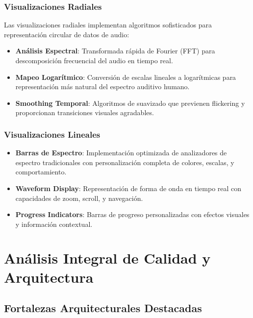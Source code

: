 \documentclass[a4paper]{article}
\begin{document}
\subsubsection{Visualizaciones Radiales}

Las visualizaciones radiales implementan algoritmos sofisticados para representación circular de datos de audio:

\begin{itemize}
\item \textbf{Análisis Espectral}: Transformada rápida de Fourier (FFT) para descomposición frecuencial del audio en tiempo real.

\item \textbf{Mapeo Logarítmico}: Conversión de escalas lineales a logarítmicas para representación más natural del espectro auditivo humano.

\item \textbf{Smoothing Temporal}: Algoritmos de suavizado que previenen flickering y proporcionan transiciones visuales agradables.
\end{itemize}

\subsubsection{Visualizaciones Lineales}

\begin{itemize}
\item \textbf{Barras de Espectro}: Implementación optimizada de analizadores de espectro tradicionales con personalización completa de colores, escalas, y comportamiento.

\item \textbf{Waveform Display}: Representación de forma de onda en tiempo real con capacidades de zoom, scroll, y navegación.

\item \textbf{Progress Indicators}: Barras de progreso personalizadas con efectos visuales y información contextual.
\end{itemize}

\section{Análisis Integral de Calidad y Arquitectura}

\subsection{Fortalezas Arquitecturales Destacadas}
\end{document}
